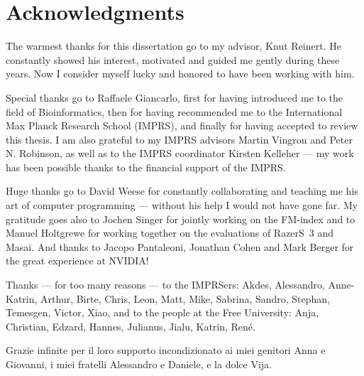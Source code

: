 \section*{Acknowledgments}
\label{sec::acknowlegments}

The warmest thanks for this dissertation go to my advisor, Knut Reinert.
He constantly showed his interest, motivated and guided me gently during these years.
Now I consider myself lucky and honored to have been working with him.

Special thanks go to Raffaele Giancarlo, first for having introduced me to the field of Bioinformatics, then for having recommended me to the International Max Planck Research School (IMPRS), and finally for having accepted to review this thesis.
I am also grateful to my IMPRS advisors Martin Vingron and Peter N. Robinson, as well as to the IMPRS coordinator Kirsten Kelleher ---
my work has been possible thanks to the financial support of the IMPRS.

Huge thanks go to David Weese for constantly collaborating and teaching me his art of computer programming --- without his help I would not have gone far.
My gratitude goes also to Jochen Singer for jointly working on the FM-index and to Manuel Holtgrewe for working together on the evaluations of RazerS~3 and Masai.
And thanks to Jacopo Pantaleoni, Jonathan Cohen and Mark Berger for the great experience at NVIDIA!

Thanks --- for too many reasons --- to the IMPRSers: Akdes, Alessandro, Anne-Katrin, Arthur, Birte, Chris, Leon, Matt, Mike, Sabrina, Sandro, Stephan, Temesgen, Victor, Xiao, 
and to the people at the Free University: Anja, Christian, Edzard, Hannes, Julianus, Jialu, Katrin, Ren\'e.

Grazie infinite per il loro supporto incondizionato ai miei genitori Anna e Giovanni, i miei fratelli Alessandro e Daniele, e la dolce Vija.
